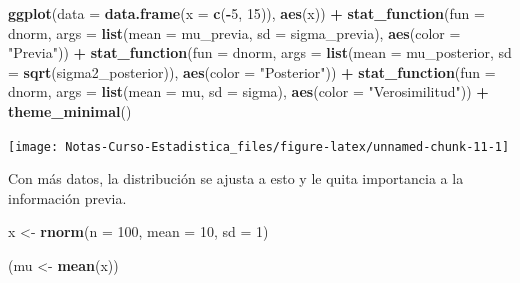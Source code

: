 \documentclass[
  12pt,
]{book}
\newenvironment{Shaded}{\begin{snugshade}}{\end{snugshade}}
\newcommand{\DataTypeTok}[1]{\textcolor[rgb]{0.13,0.29,0.53}{#1}}
\newcommand{\DecValTok}[1]{\textcolor[rgb]{0.00,0.00,0.81}{#1}}
\newcommand{\KeywordTok}[1]{\textcolor[rgb]{0.13,0.29,0.53}{\textbf{#1}}}
\newcommand{\NormalTok}[1]{#1}
\newcommand{\OperatorTok}[1]{\textcolor[rgb]{0.81,0.36,0.00}{\textbf{#1}}}
\newcommand{\StringTok}[1]{\textcolor[rgb]{0.31,0.60,0.02}{#1}}
\begin{document}
\begin{Shaded}
\begin{Highlighting}[]
\KeywordTok{ggplot}\NormalTok{(}\DataTypeTok{data =} \KeywordTok{data.frame}\NormalTok{(}\DataTypeTok{x =} \KeywordTok{c}\NormalTok{(}\OperatorTok{{-}}\DecValTok{5}\NormalTok{, }\DecValTok{15}\NormalTok{)), }\KeywordTok{aes}\NormalTok{(x)) }\OperatorTok{+}\StringTok{ }
\StringTok{    }\KeywordTok{stat\_function}\NormalTok{(}\DataTypeTok{fun =}\NormalTok{ dnorm, }\DataTypeTok{args =} \KeywordTok{list}\NormalTok{(}\DataTypeTok{mean =}\NormalTok{ mu\_previa, }
        \DataTypeTok{sd =}\NormalTok{ sigma\_previa), }\KeywordTok{aes}\NormalTok{(}\DataTypeTok{color =} \StringTok{"Previa"}\NormalTok{)) }\OperatorTok{+}\StringTok{ }
\StringTok{    }\KeywordTok{stat\_function}\NormalTok{(}\DataTypeTok{fun =}\NormalTok{ dnorm, }\DataTypeTok{args =} \KeywordTok{list}\NormalTok{(}\DataTypeTok{mean =}\NormalTok{ mu\_posterior, }
        \DataTypeTok{sd =} \KeywordTok{sqrt}\NormalTok{(sigma2\_posterior)), }\KeywordTok{aes}\NormalTok{(}\DataTypeTok{color =} \StringTok{"Posterior"}\NormalTok{)) }\OperatorTok{+}\StringTok{ }
\StringTok{    }\KeywordTok{stat\_function}\NormalTok{(}\DataTypeTok{fun =}\NormalTok{ dnorm, }\DataTypeTok{args =} \KeywordTok{list}\NormalTok{(}\DataTypeTok{mean =}\NormalTok{ mu, }
        \DataTypeTok{sd =}\NormalTok{ sigma), }\KeywordTok{aes}\NormalTok{(}\DataTypeTok{color =} \StringTok{"Verosimilitud"}\NormalTok{)) }\OperatorTok{+}\StringTok{ }
\StringTok{    }\KeywordTok{theme\_minimal}\NormalTok{()}
\end{Highlighting}
\end{Shaded}

\begin{center}\texttt{[image: Notas-Curso-Estadistica\_files/figure-latex/unnamed-chunk-11-1]} \end{center}

Con más datos, la distribución se ajusta a esto y le quita importancia a la información previa.

\begin{Shaded}
\begin{Highlighting}[]
\NormalTok{x \textless{}{-}}\StringTok{ }\KeywordTok{rnorm}\NormalTok{(}\DataTypeTok{n =} \DecValTok{100}\NormalTok{, }\DataTypeTok{mean =} \DecValTok{10}\NormalTok{, }\DataTypeTok{sd =} \DecValTok{1}\NormalTok{)}

\NormalTok{(mu \textless{}{-}}\StringTok{ }\KeywordTok{mean}\NormalTok{(x))}
\end{Highlighting}
\end{Shaded}
\end{document}
